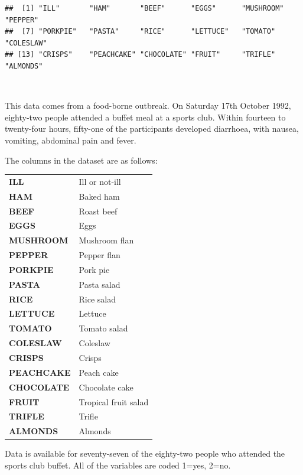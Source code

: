 \documentclass[
  12pt,
]{book}
\begin{document}
\begin{verbatim}
##  [1] "ILL"       "HAM"       "BEEF"      "EGGS"      "MUSHROOM"  "PEPPER"   
##  [7] "PORKPIE"   "PASTA"     "RICE"      "LETTUCE"   "TOMATO"    "COLESLAW" 
## [13] "CRISPS"    "PEACHCAKE" "CHOCOLATE" "FRUIT"     "TRIFLE"    "ALMONDS"
\end{verbatim}

~

This data comes from a food-borne outbreak. On Saturday 17th October 1992, eighty-two people attended a buffet meal at a sports club. Within fourteen to twenty-four hours, fifty-one of the participants developed diarrhoea, with nausea, vomiting, abdominal pain and fever.

The columns in the dataset are as follows:

\begin{longtable}[]{@{}
  >{\raggedright\arraybackslash}p{}
  >{\raggedright\arraybackslash}p{}@{}}
\toprule()
\endhead
\textbf{ILL} & Ill or not-ill \\
\textbf{HAM} & Baked ham \\
\textbf{BEEF} & Roast beef \\
\textbf{EGGS} & Eggs \\
\textbf{MUSHROOM} & Mushroom flan \\
\textbf{PEPPER} & Pepper flan \\
\textbf{PORKPIE} & Pork pie \\
\textbf{PASTA} & Pasta salad \\
\textbf{RICE} & Rice salad \\
\textbf{LETTUCE} & Lettuce \\
\textbf{TOMATO} & Tomato salad \\
\textbf{COLESLAW} & Coleslaw \\
\textbf{CRISPS} & Crisps \\
\textbf{PEACHCAKE} & Peach cake \\
\textbf{CHOCOLATE} & Chocolate cake \\
\textbf{FRUIT} & Tropical fruit salad \\
\textbf{TRIFLE} & Trifle \\
\textbf{ALMONDS} & Almonds \\
\bottomrule()
\end{longtable}

Data is available for seventy-seven of the eighty-two people who attended the sports club buffet. All of the variables are coded 1=yes, 2=no.
\end{document}

